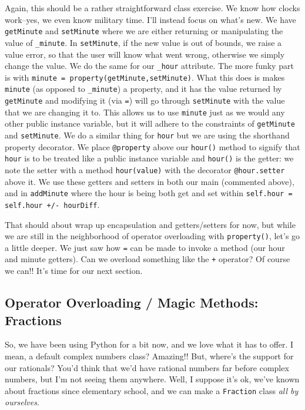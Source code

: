 \documentclass[12pt, twoside, reqno]{book}
\begin{document}
Again, this should be a rather straightforward class exercise. We know how clocks work--yes, we even know military time. I'll instead focus on what's new. We have \texttt{getMinute} and \texttt{setMinute} where we are either returning or manipulating the value of \texttt{\_minute}. In \texttt{setMinute}, if the new value is out of bounds, we raise a value error, so that the user will know what went wrong, otherwise we simply change the value. We do the same for our \texttt{\_hour} attribute. The more funky part is with \texttt{minute = property(getMinute,setMinute)}. What this does is makes \texttt{minute} (as opposed to \texttt{\_minute}) a property, and it has the value returned by \texttt{getMinute} and modifying it (via \texttt{=}) will go through \texttt{setMinute} with the value that we are changing it to. This allows us to use \texttt{minute} just as we would any other public instance variable, but it will adhere to the constraints of \texttt{getMinute} and \texttt{setMinute}. We do a similar thing for \texttt{hour} but we are using the shorthand property decorator. We place \texttt{@property} above our \texttt{hour()} method to signify that \texttt{hour} is to be treated like a public instance variable and \texttt{hour()} is the getter: we note the setter with a method \texttt{hour(value)} with the decorator \texttt{@hour.setter} above it. We use these getters and setters in both our main (commented above), and in \texttt{addMinute} where the hour is being both get and set within \texttt{self.hour = self.hour +/- hourDiff}.

That should about wrap up encapsulation and getters/setters for now, but while we are still in the neighborhood of operator overloading with \texttt{property()}, let's go a little deeper. We just saw how \texttt{=} can be made to invoke a method (our hour and minute getters). Can we overload something like the \texttt{+} operator? Of course we can!! It's time for our next section.

\subsection{Operator Overloading / Magic Methods: Fractions}

So, we have been using Python for a bit now, and we love what it has to offer. I mean, a default complex numbers class? Amazing!! But, where's the support for our rationals? You'd think that we'd have rational numbers far before complex numbers, but I'm not seeing them anywhere. Well, I suppose it's ok, we've known about fractions since elementary school, and we can make a \texttt{Fraction} class \textit{all by ourselves}.
\end{document}
